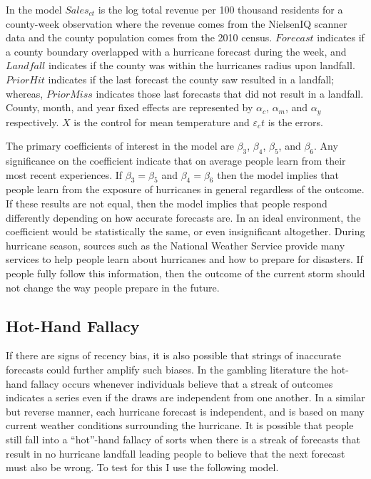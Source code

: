 \documentclass{article}
\begin{document}
In the model $Sales_{ct}$ is the log total revenue per 100 thousand residents for a county-week observation where the revenue comes from the NielsenIQ scanner data and the county population comes from the 2010 census. $Forecast$ indicates if a county boundary overlapped with a hurricane forecast during the week, and $Landfall$ indicates if the county was within the hurricanes radius upon landfall. $Prior Hit$ indicates if the last forecast the county saw resulted in a landfall; whereas, $Prior Miss$ indicates those last forecasts that did not result in a landfall. County, month, and year fixed effects are represented by $\alpha_c$, $\alpha_m$, and $\alpha_y$ respectively. $X$ is the control for mean temperature and $\varepsilon_ct$ is the errors. 

The primary coefficients of interest in the model are $\beta_3$, $\beta_4$, $\beta_5$, and $\beta_6$.  Any significance on the coefficient indicate that on average people learn from their most recent experiences. If $\beta_3 = \beta_5$ and $\beta_4 = \beta_6$ then the model implies that people learn from the exposure of hurricanes in general regardless of the outcome. If these results are not equal, then the model implies that people respond differently depending on how accurate forecasts are. In an ideal environment, the coefficient would be statistically the same, or even insignificant altogether. During hurricane season, sources such as the National Weather Service provide many services to help people learn about hurricanes and how to prepare for disasters. If people fully follow this information, then the outcome of the current storm should not change the way people prepare in the future. 

\subsection{Hot-Hand Fallacy}

If there are signs of recency bias, it is also possible that strings of inaccurate forecasts could further amplify such biases. In the gambling literature the hot-hand fallacy occurs whenever individuals believe that a streak of outcomes indicates a series even if the draws are independent from one another. In a similar but reverse manner, each hurricane forecast is independent, and is based on many current weather conditions surrounding the hurricane. It is possible that people still fall into a ``hot''-hand fallacy of sorts when there is a streak of forecasts that result in no hurricane landfall leading people to believe that the next forecast must also be wrong.  To test for this I use the following model. 
\end{document}
